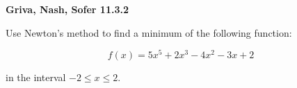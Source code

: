 \textbf{Griva, Nash, Sofer 11.3.2}

Use Newton's method to find a minimum of the following function:

$$
f(x) = 5x^5 + 2x^3 - 4x^2 - 3x + 2
$$

in the interval $-2 \le x \le 2$.

\begin{solution}
    \ \\
    \vfill
\end{solution}
